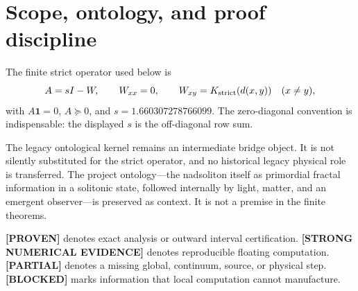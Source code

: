 \documentclass[11pt,a4paper]{article}
\newcommand{\Proven}{\textcolor{proved}{\textbf{[PROVEN]}}}
\newcommand{\Evidence}{\textcolor{conditional}{\textbf{[STRONG NUMERICAL EVIDENCE]}}}
\newcommand{\Partial}{\textcolor{conditional}{\textbf{[PARTIAL]}}}
\newcommand{\Blocked}{\textcolor{blocked}{\textbf{[BLOCKED]}}}
\begin{document}
\section{Scope, ontology, and proof discipline}

The finite strict operator used below is
\[
A=sI-W,\qquad W_{xx}=0,\qquad
W_{xy}=K_{\rm strict}(d(x,y))\quad(x\ne y),
\]
with $A\mathbf1=0$, $A\succeq0$, and
$s=1.660307278766099$. The zero-diagonal convention is indispensable: the displayed $s$
is the off-diagonal row sum.

The legacy ontological kernel remains an intermediate bridge object. It is not silently
substituted for the strict operator, and no historical legacy physical role is transferred.
The project ontology---the nadsoliton itself as primordial fractal information in a
solitonic state, followed internally by light, matter, and an emergent observer---is
preserved as context. It is not a premise in the finite theorems.

\Proven{} denotes exact analysis or outward interval certification. \Evidence{} denotes
reproducible floating computation. \Partial{} denotes a missing global, continuum, source,
or physical step. \Blocked{} marks information that local computation cannot manufacture.
\end{document}

